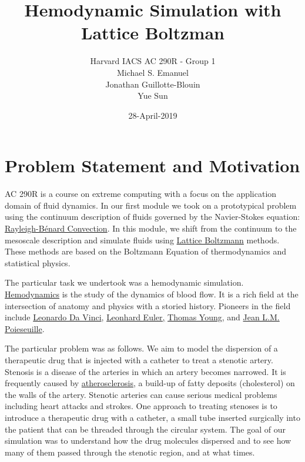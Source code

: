 \documentclass[11pt]{article} %
\title{Hemodynamic Simulation with Lattice Boltzman}
\author{Harvard IACS AC 290R - Group 1 \\
Michael S. Emanuel \\
Jonathan Guillotte-Blouin \\
Yue Sun \\
}
\date{28-April-2019}
\begin{document}
\maketitle

\section{Problem Statement and Motivation}
AC 290R is a course on extreme computing with a focus on the application domain of fluid dynamics.
In our first module we took on a prototypical problem using the continuum description of fluids
governed by the Navier-Stokes equation: 
\href{https://en.wikipedia.org/wiki/Rayleigh%E2%80%93B%C3%A9nard_convection}{Rayleigh-B\'enard Convection}.
In this module, we shift from the continuum to the mesoscale description and simulate fluids using  
\href{https://en.wikipedia.org/wiki/Lattice_Boltzmann_methods}{Lattice Boltzmann} methods.  
These methods are based on the Boltzmann Equation of thermodynamics and statistical physics.

The particular task we undertook was a hemodynamic simulation.
\href{https://en.wikipedia.org/wiki/Hemodynamics}{Hemodynamics} is the study of the dynamics of blood flow.  
It is a rich field at the intersection of anatomy and physics with a storied history.
Pioneers in the field include 
\href{https://en.wikipedia.org/wiki/Leonardo_da_Vinci}{Leonardo Da Vinci}, 
\href{https://en.wikipedia.org/wiki/Leonhard_Euler}{Leonhard Euler,} 
\href{https://en.wikipedia.org/wiki/Thomas_Young_(scientist)}{Thomas Young}, and 
\href{https://en.wikipedia.org/wiki/Jean_L%C3%A9onard_Marie_Poiseuille}{Jean L.M. Poieseuille}.

The particular problem was as follows.  
We aim to model the dispersion of a therapeutic drug that is injected with a catheter to treat a stenotic artery.
Stenosis is a disease of the arteries in which an artery becomes narrowed.
It is frequently caused by 
\href{https://en.wikipedia.org/wiki/Atherosclerosis}{atherosclerosis}, 
a build-up of fatty deposits (cholesterol) on the walls of the artery.
Stenotic arteries can cause serious medical problems including heart attacks and strokes.
One approach to treating stenoses is to introduce a therapeutic drug with a catheter,
a small tube inserted surgically into the patient that can be threaded through the circular system.
The goal of our simulation was to understand how the drug molecules dispersed 
and to see how many of them passed through the stenotic region, and at what times.
\end{document}

